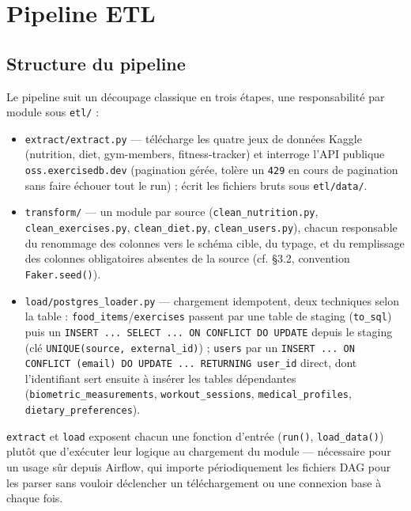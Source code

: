 \documentclass{article}
\begin{document}
\section{Pipeline ETL}

\subsection{Structure du pipeline}

Le pipeline suit un découpage classique en trois étapes, une responsabilité par module sous \texttt{etl/} :

\begin{itemize}[leftmargin=1.4em]
  \item \texttt{extract/extract.py} — télécharge les quatre jeux de données Kaggle (nutrition, diet, gym-members, fitness-tracker) et interroge l'API publique \texttt{oss.exercisedb.dev} (pagination gérée, tolère un \texttt{429} en cours de pagination sans faire échouer tout le run) ; écrit les fichiers bruts sous \texttt{etl/data/}.
  \item \texttt{transform/} — un module par source (\texttt{clean\_nutrition.py}, \texttt{clean\_exercises.py}, \texttt{clean\_diet.py}, \texttt{clean\_users.py}), chacun responsable du renommage des colonnes vers le schéma cible, du typage, et du remplissage des colonnes obligatoires absentes de la source (cf. \S3.2, convention \texttt{Faker.seed()}).
  \item \texttt{load/postgres\_loader.py} — chargement idempotent, deux techniques selon la table : \texttt{food\_items}/\texttt{exercises} passent par une table de staging (\texttt{to\_sql}) puis un \texttt{INSERT ... SELECT ... ON CONFLICT DO UPDATE} depuis le staging (clé \texttt{UNIQUE(source, external\_id)}) ; \texttt{users} par un \texttt{INSERT ... ON CONFLICT (email) DO UPDATE ... RETURNING user\_id} direct, dont l'identifiant sert ensuite à insérer les tables dépendantes (\texttt{biometric\_measurements}, \texttt{workout\_sessions}, \texttt{medical\_profiles}, \texttt{dietary\_preferences}).
\end{itemize}

\texttt{extract} et \texttt{load} exposent chacun une fonction d'entrée (\texttt{run()}, \texttt{load\_data()}) plutôt que d'exécuter leur logique au chargement du module — nécessaire pour un usage sûr depuis Airflow, qui importe périodiquement les fichiers DAG pour les parser sans vouloir déclencher un téléchargement ou une connexion base à chaque fois.
\end{document}
